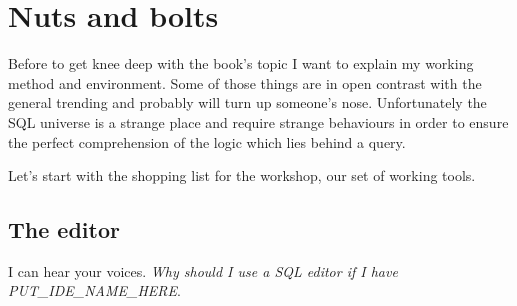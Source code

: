 \chapter{Nuts and bolts}
Before to get knee deep with the book's topic I want to explain my working method and environment.
Some of those things are in open contrast with the general trending and probably will turn up
someone's nose. Unfortunately the SQL universe is a strange place and require strange behaviours
in order to ensure the perfect comprehension of the logic which lies behind a query.\newline

Let's start with the shopping list for the workshop, our set of working tools.

\section{The editor}
I can hear your voices. \textit{Why should I use a SQL editor if I have PUT\_IDE\_NAME\_HERE}.  